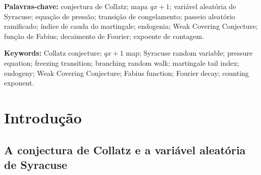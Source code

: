 \documentclass[11pt]{article}
\theoremstyle{definition}
\theoremstyle{remark}
\begin{document}
\begin{abstract}
$0{,}678$. Por fim, uma busca literária dirigida situa a barreira com
precisão dentro da teoria mais ampla de decaimento de Fourier para
medidas autossimilares e autoconformais \cite{BakerBanaji2026,
Bremont}, mostrando que ela é estruturalmente inacessível a esse
ferramental por causa da rigidez dos subgrupos fechados de
$\mathbb{Z}_3^\times$, e identifica um quinto vocabulário, puramente
combinatório e testável de forma independente, para a mesma obstrução
em trabalho muito recente \cite{Chang2026}. Argumentamos que essa
convergência de cinco vocabulários
metodologicamente independentes e tecnicamente não relacionados ---
duas de cujas coincidências par-a-par são, elas mesmas, identidades
provadas, não analogias, e são contadas uma vez cada --- sobre a
mesma afirmação não provada é, por si só, evidência significativa de
que a obstrução é uma característica genuína do problema, não um
artefato de um método isolado, e enunciamos com precisão o que resta
provar.
\end{abstract}

\noindent\textbf{Palavras-chave:} conjectura de Collatz; mapa $qx+1$; variável aleatória
de Syracuse; equação de pressão; transição de congelamento; passeio aleatório ramificado;
índice de cauda do martingale; endogenia; Weak Covering Conjecture; função de Fabius;
decaimento de Fourier; expoente de contagem.

\noindent\textbf{Keywords:} Collatz conjecture; $qx+1$ map; Syracuse random variable;
pressure equation; freezing transition; branching random walk; martingale tail index;
endogeny; Weak Covering Conjecture; Fabius function; Fourier decay; counting exponent.

\tableofcontents

\section{Introdução}

\subsection{A conjectura de Collatz e a variável aleatória de Syracuse}
\end{document}
